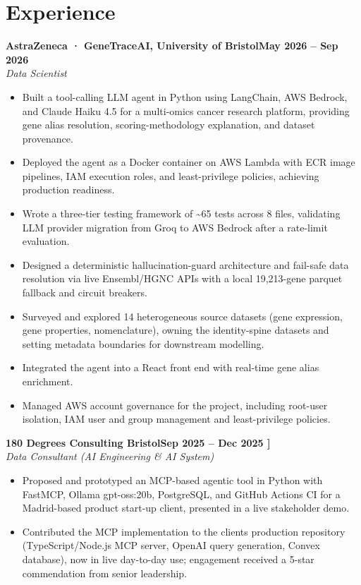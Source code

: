 \documentclass[a4paper,11pt]{article}
\newcommand{\entry}[4]{\needspace{4\baselineskip}\noindent\textbf{#1}\hfill\textbf{#2}\\ \textit{#3}\hfill\textit{#4}\par}
\begin{document}
\section{Experience}
\entry{AstraZeneca · GeneTraceAI, University of Bristol}{May 2026 – Sep 2026}{Data Scientist}{}
\begin{itemize}
  \item Built a tool-calling LLM agent in Python using LangChain, AWS Bedrock, and Claude Haiku 4.5 for a multi-omics cancer research platform, providing gene alias resolution, scoring-methodology explanation, and dataset provenance.
  \item Deployed the agent as a Docker container on AWS Lambda with ECR image pipelines, IAM execution roles, and least-privilege policies, achieving production readiness.
  \item Wrote a three-tier testing framework of \textasciitilde{}65 tests across 8 files, validating LLM provider migration from Groq to AWS Bedrock after a rate-limit evaluation.
  \item Designed a deterministic hallucination-guard architecture and fail-safe data resolution via live Ensembl/HGNC APIs with a local 19,213-gene parquet fallback and circuit breakers.
  \item Surveyed and explored 14 heterogeneous source datasets (gene expression, gene properties, nomenclature), owning the identity-spine datasets and setting metadata boundaries for downstream modelling.
  \item Integrated the agent into a React front end with real-time gene alias enrichment.
  \item Managed AWS account governance for the project, including root-user isolation, IAM user and group management and least-privilege policies.
\end{itemize}
\vspace{4pt}
\entry{180 Degrees Consulting Bristol}{Sep 2025 – Dec 2025   ]}{Data Consultant (AI Engineering \& AI System)}{}
\begin{itemize}
  \item Proposed and prototyped an MCP-based agentic tool in Python with FastMCP, Ollama gpt-oss:20b, PostgreSQL, and GitHub Actions CI for a Madrid-based product start-up client, presented in a live stakeholder demo.
  \item Contributed the MCP implementation to the client\textquotesingle{}s production repository (TypeScript/Node.js MCP server, OpenAI query generation, Convex database), now in live day-to-day use; engagement received a 5-star commendation from senior leadership.
\end{itemize}
\end{document}
